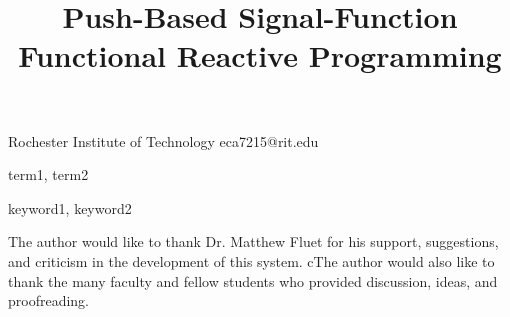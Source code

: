 \documentclass[preprint]{sigplanconf}
\begin{document}
\copyrightdata{[to be supplied]} 

\titlebanner{}        %
\preprintfooter{}   %

\title{Push-Based Signal-Function Functional Reactive Programming}

           {Rochester Institute of Technology}
           {eca7215@rit.edu}

\maketitle

\begin{abstract}

\end{abstract}


\terms
term1, term2

\keywords
keyword1, keyword2










\acks

The author would like to thank Dr. Matthew Fluet for his support, suggestions,
and criticism in the development of this system. cThe author would also like to
thank the many faculty and fellow students who provided discussion, ideas, and
proofreading.





\end{document}

